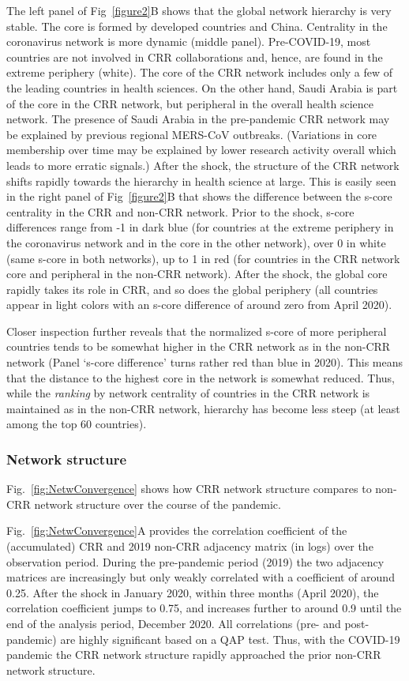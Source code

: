 The left panel of Fig~\ref{figure2}B shows that the global network hierarchy is very stable. The core is formed by developed countries and China. Centrality in the coronavirus network is more dynamic (middle panel). Pre-COVID-19, most countries are not involved in CRR collaborations and, hence, are found in the extreme periphery (white). The core of the CRR network includes only a few of the leading countries in health sciences. On the other hand, Saudi Arabia is part of the core in the CRR network, but peripheral in the overall health science network. The presence of Saudi Arabia in the pre-pandemic CRR network may be explained by previous regional MERS-CoV outbreaks. (Variations in core membership over time may be explained by lower research activity overall which leads to more erratic signals.) After the shock, the structure of the CRR network shifts rapidly towards the hierarchy in health science at large. This is easily seen in the right panel of Fig~\ref{figure2}B that shows the difference between the s-core centrality in the CRR and non-CRR network. Prior to the shock, s-core differences range from -1 in dark blue (for countries at the extreme periphery in the coronavirus network and in the core in the other network), over 0 in white (same s-core in both networks), up to 1 in red (for countries in the CRR network core and peripheral in the non-CRR network). After the shock, the global core rapidly takes its role in CRR, and so does the global periphery (all countries appear in light colors with an s-core difference of around zero from April 2020). 

Closer inspection further reveals that the normalized s-core of more peripheral countries tends to be somewhat higher in the CRR network as in the non-CRR network (Panel `s-core difference' turns rather red than blue in 2020). This means that the distance to the highest core in the network is somewhat reduced. Thus, while the \textit{ranking} by network centrality of countries in the CRR network is maintained as in the non-CRR network, hierarchy has become less steep (at least among the top 60 countries). 


\subsubsection{Network structure}

Fig.~\ref{fig:NetwConvergence} shows how CRR network structure compares to non-CRR network structure over the course of the pandemic. 

Fig.~\ref{fig:NetwConvergence}A provides the correlation coefficient of the (accumulated) CRR and 2019 non-CRR adjacency matrix (in logs) over the observation period. During the pre-pandemic period (2019) the two adjacency matrices are increasingly but only weakly correlated with a coefficient of around 0.25. After the shock in January 2020, within three months (April 2020), the correlation coefficient jumps to 0.75, and increases further to around 0.9 until the end of the analysis period, December 2020. All correlations (pre- and post-pandemic) are highly significant based on a QAP test. Thus, with the COVID-19 pandemic the CRR network structure rapidly approached the prior non-CRR network structure. 

